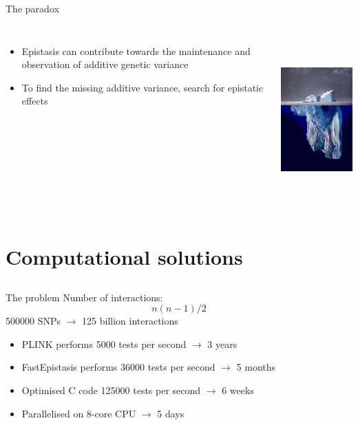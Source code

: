 \documentclass{beamer}
\begin{document}
\begin{frame}{The paradox}
\begin{columns}[c]
\begin{itemize}
\item Epistasis can contribute towards the maintenance and observation of additive genetic variance
\item To find the missing additive variance, search for epistatic effects
\end{itemize}
\includegraphics[height=6.5cm]{iceberg.jpg} \\
\end{columns}
\end{frame}


\section{Computational solutions}
\subsection{}

\begin{frame}{The problem}
Number of interactions: \\
\begin{equation}
n(n-1) / 2 \nonumber
\end{equation}
500000 SNPs $\rightarrow$ 125 billion interactions \\
\begin{itemize}
\item PLINK performs 5000 tests per second $\rightarrow$ 3 years
\item FastEpistasis performs 36000 tests per second $\rightarrow$ 5 months
\item Optimised C code 125000 tests per second $\rightarrow$ 6 weeks
\item Parallelised on 8-core CPU $\rightarrow$ 5 days
\end{itemize}
\end{frame}
\end{document}
